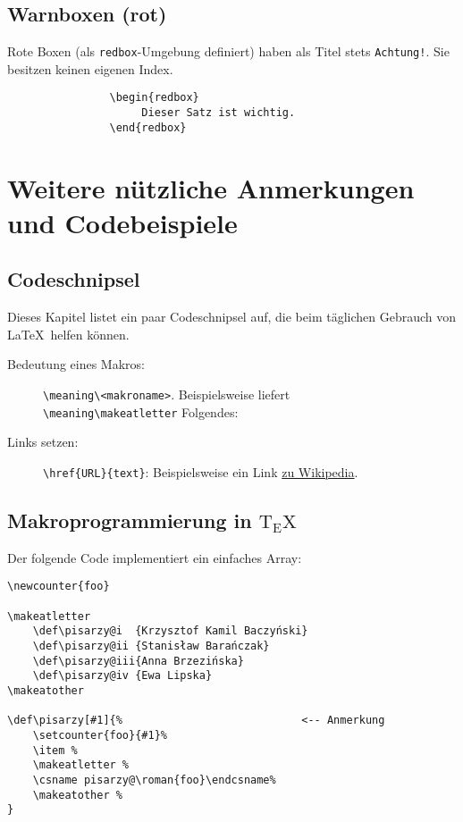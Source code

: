 		\section{Warnboxen (rot)}
			Rote Boxen (als \verb|redbox|-Umgebung definiert) haben als Titel stets \texttt{Achtung!}. Sie besitzen keinen eigenen Index.
			
			\begin{verbatim}
				\begin{redbox}
				     Dieser Satz ist wichtig.
				\end{redbox}
			\end{verbatim}
			
			
	\chapter{Weitere nützliche Anmerkungen und Codebeispiele}
		\section{Codeschnipsel}
			Dieses Kapitel listet ein paar Codeschnipsel auf, die beim täglichen Gebrauch von \LaTeX\ helfen können.
			\begin{description}
				\item[Bedeutung eines Makros:]
					\verb|\meaning\<makroname>|. Beispielsweise liefert\\\verb|\meaning\makeatletter| Folgendes: \texttt{\meaning\makeatletter}
				\item[Links setzen:]
					\verb|\href{URL}{text}|: Beispielsweise ein Link \href{https://de.wikipedia.org/wiki/LaTeX}{zu Wikipedia}.
			\end{description}
			
		\section{Makroprogrammierung in ${\mathrm{T\!_{\displaystyle E}\!X}}$}
			Der folgende Code implementiert ein einfaches Array:
			\begin{verbatim}
\newcounter{foo}

\makeatletter
    \def\pisarzy@i 	{Krzysztof Kamil Baczyński}
    \def\pisarzy@ii	{Stanisław Barańczak}
    \def\pisarzy@iii{Anna Brzezińska}
    \def\pisarzy@iv {Ewa Lipska}
\makeatother

\def\pisarzy[#1]{%                            <-- Anmerkung
    \setcounter{foo}{#1}%
    \item %
    \makeatletter %
    \csname pisarzy@\roman{foo}\endcsname%
    \makeatother %
}
			\end{verbatim}
			
